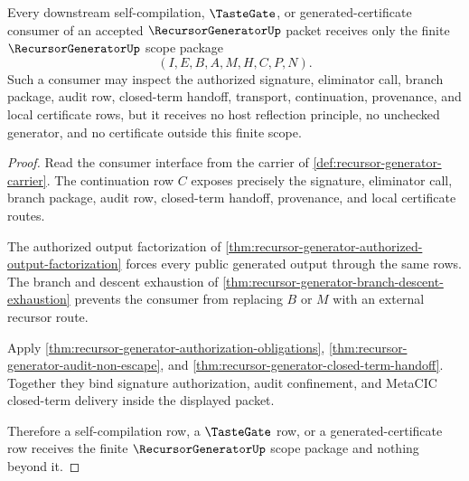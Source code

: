 \begin{theorem}
\label{thm:recursor-generator-downstream-scope-package}
Every downstream self-compilation, $\TasteGate$, or generated-certificate consumer of an accepted $\RecursorGeneratorUp$ packet receives only the finite $\RecursorGeneratorUp$ scope package
$$
(I,E,B,A,M,H,C,P,N).
$$
Such a consumer may inspect the authorized signature, eliminator call, branch package, audit row, closed-term handoff, transport, continuation, provenance, and local certificate rows, but it receives no host reflection principle, no unchecked generator, and no certificate outside this finite scope.
\end{theorem}
\begin{proof}
Read the consumer interface from the carrier of \autoref{def:recursor-generator-carrier}. The continuation row $C$ exposes precisely the signature, eliminator call, branch package, audit row, closed-term handoff, provenance, and local certificate routes.

The authorized output factorization of \autoref{thm:recursor-generator-authorized-output-factorization} forces every public generated output through the same rows. The branch and descent exhaustion of \autoref{thm:recursor-generator-branch-descent-exhaustion} prevents the consumer from replacing $B$ or $M$ with an external recursor route.

Apply \autoref{thm:recursor-generator-authorization-obligations}, \autoref{thm:recursor-generator-audit-non-escape}, and \autoref{thm:recursor-generator-closed-term-handoff}. Together they bind signature authorization, audit confinement, and MetaCIC closed-term delivery inside the displayed packet.

Therefore a self-compilation row, a $\TasteGate$ row, or a generated-certificate row receives the finite $\RecursorGeneratorUp$ scope package and nothing beyond it.
\end{proof}

